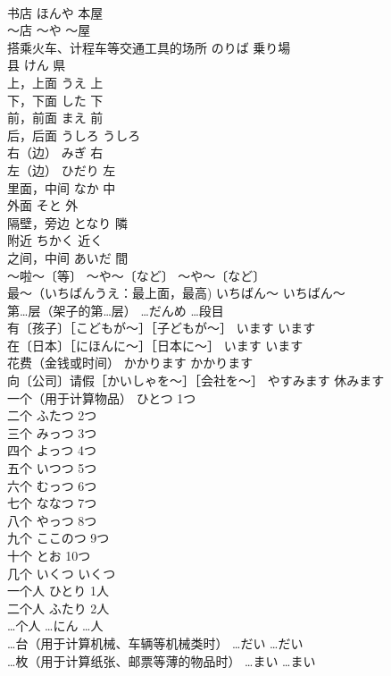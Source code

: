 \documentclass[8pt]{extreport}
\begin{document}
\begin{CJK}{UTF8}{min}
\\	书店	ほんや	本屋
\\	～店	～や	～屋
\\	搭乘火车、计程车等交通工具的场所	のりば	乗り場
\\	县	けん	県
\\	上，上面	うえ	上
\\	下，下面	した	下
\\	前，前面	まえ	前
\\	后，后面	うしろ	うしろ
\\	右（边）	みぎ	右
\\	左（边）	ひだり	左
\\	里面，中间	なか	中
\\	外面	そと	外
\\	隔壁，旁边	となり	隣
\\	附近	ちかく	近く
\\	之间，中间	あいだ	間
\\	～啦～〔等〕	～や～〔など〕	～や～〔など〕
\\	最～（いちばんうえ：最上面，最高)	いちばん～	いちばん～
\\	第…层（架子的第…层）	…だんめ	…段目
\\	有〔孩子〕［こどもが～］［子どもが～］	います	います
\\	在〔日本〕［にほんに～］［日本に～］	います	います
\\	花费（金钱或时间）	かかります	かかります
\\	向〔公司〕请假［かいしゃを～］［会社を～］	やすみます	休みます
\\	一个（用于计算物品）	ひとつ	1つ
\\	二个	ふたつ	2つ
\\	三个	みっつ	3つ
\\	四个	よっつ	4つ
\\	五个	いつつ	5つ
\\	六个	むっつ	6つ
\\	七个	ななつ	7つ
\\	八个	やっつ	8つ
\\	九个	ここのつ	9つ
\\	十个	とお	10つ
\\	几个	いくつ	いくつ
\\	一个人	ひとり	1人
\\	二个人	ふたり	2人
\\	…个人	…にん	…人
\\	…台（用于计算机械、车辆等机械类时）	…だい	…だい
\\	…枚（用于计算纸张、邮票等薄的物品时）	…まい	…まい

\end{CJK}
\end{document}

